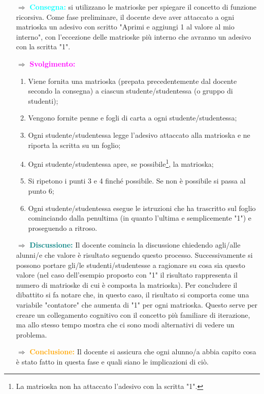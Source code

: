 \begin{itemize}
    \item [$\Rightarrow$] \textbf{\textcolor{cyan}{Consegna:}} si utilizzano le matrioske per spiegare 
    il concetto di funzione ricorsiva. Come fase preliminare, il docente deve aver attaccato a ogni matrioska 
    un adesivo con scritto "Aprimi e aggiungi 1 al valore al mio interno", con l'eccezione delle matrioske più interno che avranno
    un adesivo con la scritta "1".
    \item [$\Rightarrow$] \textbf{\textcolor{magenta}{Svolgimento:}}
    \begin{enumerate}
        \item Viene fornita una matrioska (prepata precedentemente dal docente secondo la consegna) a ciascun studente/studentessa (o gruppo di studenti);
        \item Vengono fornite penne e fogli di carta a ogni studente/studentessa;
        \item Ogni studente/studentessa legge l'adesivo attaccato alla matrioska e ne riporta la scritta
        su un foglio;
        \item Ogni studente/studentessa apre, se possibile\footnote{La matrioska non ha attaccato l'adesivo con la scritta "1".},
        la matrioska;
        \item Si ripetono i punti 3 e 4 finché possibile. Se non è possibile si passa al punto 6;
        \item Ogni studente/studentessa esegue le istruzioni che ha trascritto sul foglio cominciando dalla penultima (in quanto l'ultima e semplicemente "1")
        e proseguendo a ritroso.
    \end{enumerate}
    \item [$\Rightarrow$] \textbf{\textcolor{teal}{Discussione:}} Il docente comincia la discussione chiedendo agli/alle alunni/e 
    che valore è risultato seguendo questo processo. Successivamente si possono portare
    gli/le studenti/studentesse a ragionare su cosa sia questo valore (nel caso dell'esempio proposto con "1" 
    il risultato rappresenta il numero di matrioske di cui è composta la matrioska). Per concludere il dibattito
    si fa notare che, in questo caso, il risultato si comporta come una variabile "contatore" che aumenta di "1"
    per ogni matrioska. Questo serve per creare un collegamento cognitivo con il concetto più familiare di
    iterazione, ma allo stesso tempo mostra che ci sono modi alternativi di vedere un problema.  
    \item [$\Rightarrow$] \textbf{\textcolor{orange}{Conclusione:}} Il docente si assicura che ogni
    alunno/a abbia capito cosa è stato fatto in questa fase e quali siano le implicazioni di ciò. 
\end{itemize}

